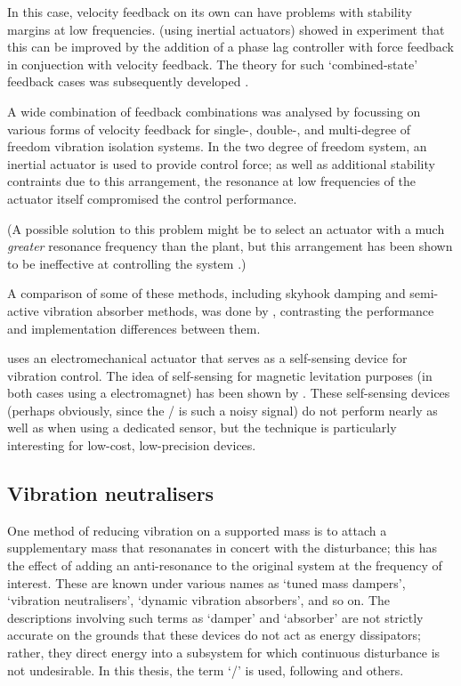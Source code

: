In this case, velocity feedback on its own can have problems with stability
margins at low frequencies.
\textcite{benassi2002a} (using inertial actuators)
showed in experiment that this can be improved by the addition of a phase lag
controller with force feedback in conjuection with velocity feedback.
The
theory for such `combined-state' feedback cases was subsequently developed
\cite{benassi2002b}.

A wide combination of feedback combinations was analysed by
\textcite{diaz2005} focussing on various forms of velocity feedback for
single-, double-, and multi-degree of freedom vibration isolation systems.
In
the two degree of freedom system, an inertial actuator is used to provide
control force; as well as additional stability contraints due to this
arrangement, the resonance at low frequencies of the actuator itself
compromised the control performance.

(A possible solution to this problem might be to select an actuator with a
much \emph{greater} resonance frequency than the plant, but this arrangement
has been shown to be ineffective at controlling the system
\cite[][Appendix~A]{benassi2002}.)

A comparison of some of these methods, including skyhook damping and
semi-active vibration absorber methods, was done by \textcite{huyanan2007},
contrasting the performance and implementation differences between them.

\textcite{paulitsch2003} uses an electromechanical actuator that serves as a
self-sensing device for vibration control.
The idea of self-sensing for
magnetic levitation purposes (in both cases using a electromagnet) has been
shown by \textcite{bleuler1992,vischer1993}.
These self-sensing devices
(perhaps obviously, since the \backemf/ is such a noisy
signal) do not perform nearly as well as when using a dedicated sensor, but
the technique is particularly interesting for low-cost, low-precision devices.



\subsection{Vibration neutralisers}

One method of reducing vibration on a supported mass is to attach a
supplementary mass that resonanates in concert with the disturbance; this has
the effect of adding an anti-resonance to the original system at the frequency
of interest.
These are known under various names as `tuned mass dampers',
`vibration neutralisers', `dynamic vibration absorbers', and so on.
The descriptions
involving such terms as `damper' and `absorber' are not strictly accurate on
the grounds that these devices do not act as energy dissipators; rather, they
direct energy into a subsystem for which continuous disturbance is not
undesirable.
In this thesis, the term `\vibneut/' is used, following
\textcite{kidner1998} and others.

